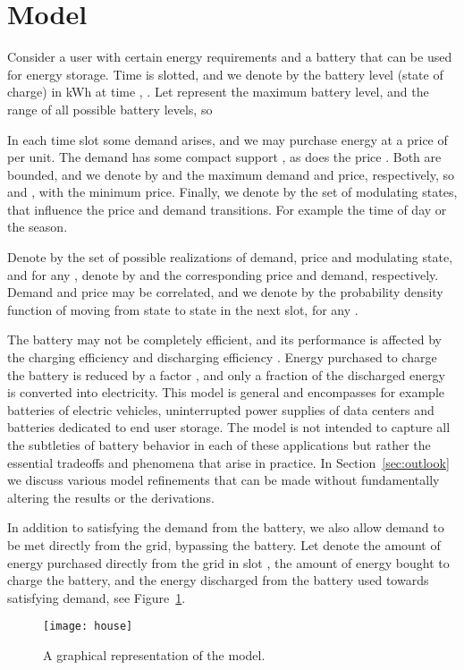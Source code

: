 \documentclass[journal]{IEEEtran}
\newcommand\1{\mathbf{1}}
\begin{document}
\section{Model}\label{sec:model}

Consider a user with certain energy requirements and a battery that can be used for energy storage. Time is slotted, and we denote by  the battery level (state of charge) in kWh at time , . Let  represent the maximum battery level, and  the range of all possible battery levels, so

In each time slot  some demand  arises, and we may purchase energy at a price of  per unit. The demand has some compact support , as does the price . Both are bounded, and we denote by  and  the maximum demand and price, respectively, so  and , with  the minimum price. Finally, we denote by  the set of modulating states, that influence the price and demand transitions. For example the time of day or the season.

Denote by  the set of possible realizations of demand, price and modulating state, and for any , denote by  and  the corresponding price and demand, respectively. Demand and price may be correlated, and we denote by  the probability density function of moving from state  to state  in the next slot, for any .

The battery may not be completely efficient, and its performance is affected by the charging efficiency   and discharging efficiency . Energy purchased to charge the battery is reduced by a factor , and only a fraction  of the discharged energy is converted into electricity.
This model is general and encompasses for example batteries of electric vehicles, uninterrupted power supplies of data centers and batteries dedicated to end user storage.  The model is not intended to capture all the subtleties of battery behavior in each of these applications but rather the essential tradeoffs and phenomena that arise in practice.
In Section~\ref{sec:outlook} we discuss various model refinements that can be made without fundamentally altering the results or the derivations.

In addition to satisfying the demand from the battery, we also allow demand to be met directly from the grid, bypassing the battery. Let  denote the amount of energy purchased directly from the grid in slot ,  the amount of energy bought to charge the battery, and  the energy discharged from the battery used towards satisfying demand, see Figure~\ref{fig:house}.

\begin{figure}[h]
    \begin{center}
        \texttt{[image: house]}
    \end{center}
    \caption{A graphical representation of the model.}
    \label{fig:house}
\end{figure}
\end{document}
